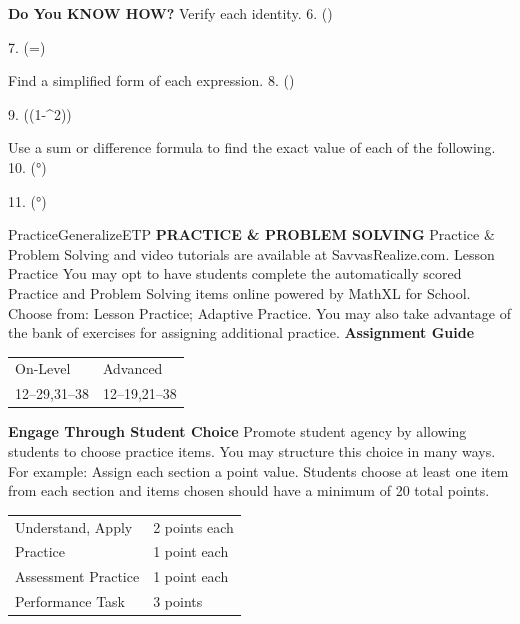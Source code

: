 \documentclass{article}
\newenvironment{concept-summary}{}{}    %
\newenvironment{te-addendum}[2]{}{}     %
\newcommand{\answer}[1]{}               %
\newcommand{\te}[1]{}                   %
\begin{document}
\begin{concept-summary}
\textbf{Do You KNOW HOW?}
Verify each identity.
6. (\sin\theta\sec\theta\cot{})
\answer{(\sin\theta\cdot\sec\theta\cdot\cot\theta\stackrel?=1); (\sin\theta\cdot\frac1{\cos\theta}\cdot\frac{\cos\theta}{\sin\theta}\stackrel?=1); \te{Sine and cosine factors crossed out.} (1=1).}
7. (\sec\theta\cot\theta=\csc\theta)
\answer{(\sec\theta\cdot\cot\theta\stackrel?=\csc\theta); (\frac1{\cos\theta}\cdot\frac{\cos\theta}{\sin\theta}\stackrel?=\csc\theta); \te{Cosine factors crossed out.} (\frac1{\sin\theta}=\csc\theta).}
Find a simplified form of each expression.
8. (\frac{\tan\theta}{\sin\theta})
\answer{(\sec\theta)}
9. (\frac{\sec\theta}{\sin\theta}(1-\cos^2\theta))
\answer{(\tan\theta)}
Use a sum or difference formula to find the exact value of each of the following.
10. (°)
\answer{(\frac{\sqrt6-\sqrt2}{4})}
11. (°)
\answer{(\frac{\sqrt2-\sqrt6}{4})}
\end{concept-summary}
\begin{te-addendum}{Practice}{GeneralizeETP}
\textbf{PRACTICE \& PROBLEM SOLVING}
Practice \& Problem Solving and video tutorials are available at SavvasRealize.com.
Lesson Practice You may opt to have students complete the automatically scored Practice and Problem Solving items online powered by MathXL for School.
Choose from: Lesson Practice; Adaptive Practice.
You may also take advantage of the bank of exercises for assigning additional practice.
\textbf{Assignment Guide}
\begin{tabular}{ll}
On-Level & Advanced \\
12--29,31--38 & 12--19,21--38 \\
\end{tabular}
\textbf{Engage Through Student Choice}
Promote student agency by allowing students to choose practice items. You may structure this choice in many ways.
For example:
Assign each section a point value. Students choose at least one item from each section and items chosen should have a minimum of 20 total points.
\begin{tabular}{ll}
Understand, Apply & 2 points each \\
Practice & 1 point each \\
Assessment Practice & 1 point each \\
Performance Task & 3 points \\
\end{tabular}
\te{Scan the QR code to access a video tutorial. See answers for Exercises 17, 20--22, 25, 26, and 31 on next page.}
\end{te-addendum}
\end{document}
